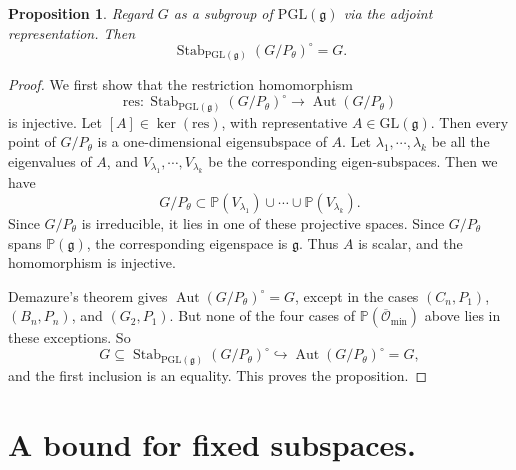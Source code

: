\documentclass[12pt]{article}
\newtheorem{proposition}[theorem]{Proposition}
\theoremstyle{definition}
\DeclareMathOperator{\Aut}{Aut}
\DeclareMathOperator{\Stab}{Stab}
\newcommand{\res}{\mathrm{res}}
\newcommand{\GL}{\mathrm{GL}}
\newcommand{\PGL}{\mathrm{PGL}}
\newcommand{\PP}{\mathbb P}
\newcommand{\Lieg}{\mathfrak{g}}
\newcommand{\Ominbar}{\overline{\mathcal O}_{\min}}
\begin{document}
\begin{proposition}\label{projectivestabilizer}
    Regard $G$ as a subgroup of $\PGL(\Lieg)$ via the adjoint representation. Then $$\Stab_{\PGL(\Lieg)}(G/P_\theta)^\circ=G.$$
\end{proposition}
\begin{proof}


    We first show that the restriction homomorphism $$\res:\Stab_{\PGL(\Lieg)}(G/P_\theta)^\circ\rightarrow\Aut(G/P_\theta)$$ is injective. Let $[A]\in\ker(\res)$, with representative $A\in\GL(\Lieg)$. Then every point of $G/P_\theta$ is a one-dimensional eigensubspace of $A$. Let $\lambda_1,\cdots,\lambda_k$ be all the eigenvalues of $A$, and $V_{\lambda_1},\cdots,V_{\lambda_k}$ be the corresponding eigen-subspaces. Then we have $$G/P_\theta\subset\PP(V_{\lambda_1})\cup\cdots\cup\PP(V_{\lambda_k}).$$
    Since $G/P_\theta$ is irreducible, it lies in one of these projective spaces. Since $G/P_\theta$ spans $\PP(\Lieg)$, the corresponding eigenspace is $\Lieg$. Thus $A$ is scalar, and the homomorphism is injective.

    Demazure's theorem  \cite[pp.~181--182, Th\'eor\`eme~1]{Demazure} gives $\Aut(G/P_\theta)^\circ=G$, except in the cases $(C_n,P_1)$, $(B_n,P_n)$, and $(G_2,P_1)$. But none of the four cases of $\PP(\Ominbar)$ above lies in these exceptions.
So
    \[
        G\subseteq
        \Stab_{\PGL(\Lieg)}(G/P_\theta)^\circ
        \hookrightarrow\Aut(G/P_\theta)^\circ=G,
    \]
    and the first inclusion is an equality. This proves the proposition.
\end{proof}

\section{A bound for fixed subspaces.}\label{fixedbound}
\end{document}
